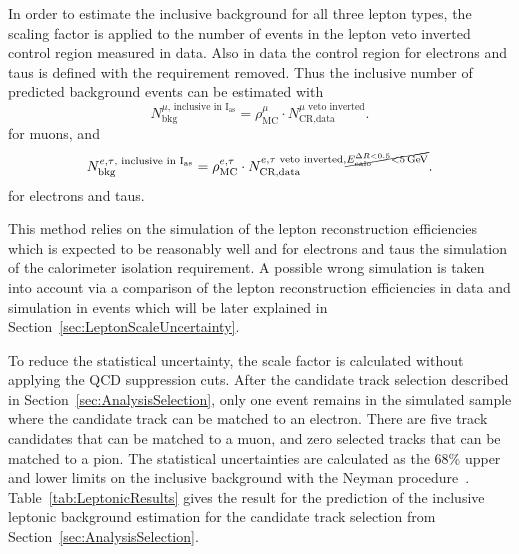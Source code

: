 In order to estimate the inclusive background for all three lepton types, the scaling factor \leptonscalefactor is applied to the number of events in the lepton veto inverted control region measured in data.
Also in data the control region for electrons and taus is defined with the \ecalo requirement removed. 
Thus the inclusive number of predicted background events can be estimated with  
\begin{equation*}
N^{\mu \text{, inclusive in I$_{\text{as}}$}}_{\text{bkg}} = \rho_{\text{MC}}^{\mu} \cdot N_{\text{CR,data}}^{\mu\text{ veto inverted}}.
\end{equation*}
for muons, and 
\begin{equation*}
N^{e,\tau\text{, inclusive in I$_{\text{as}}$}}_{\text{bkg}} = \rho_{\text{MC}}^{e,\tau} \cdot N_{\text{CR,data}}^{e,\tau\text{ veto inverted}, \cancel{E^{\Delta R<0.5}_{\text{calo}}<5\,\text{Ge}\kern-0.06667em\text{V}}}.
\end{equation*}
for electrons and taus.

This method relies on the simulation of the lepton reconstruction efficiencies which is expected to be reasonably well and for electrons and taus the simulation of the calorimeter isolation requirement.
A possible wrong simulation is taken into account via a comparison of the lepton reconstruction efficiencies in data and simulation in \Zlep events which will be later explained in Section~\ref{sec:LeptonScaleUncertainty}.

To reduce the statistical uncertainty, the scale factor is calculated without applying the QCD suppression cuts. 
After the candidate track selection described in Section~\ref{sec:AnalysisSelection}, only one event remains in the simulated \WJets sample where the candidate track can be matched to an electron.
There are five track candidates that can be matched to a muon, and zero selected tracks that can be matched to a pion.
The statistical uncertainties are calculated as the 68\% upper and lower limits on the inclusive background with the Neyman procedure~\cite{bib:Neyman_1937,bib:PDG_2014}.
Table~\ref{tab:LeptonicResults} gives the result for the prediction of the inclusive leptonic background estimation for the candidate track selection from Section~\ref{sec:AnalysisSelection}.

